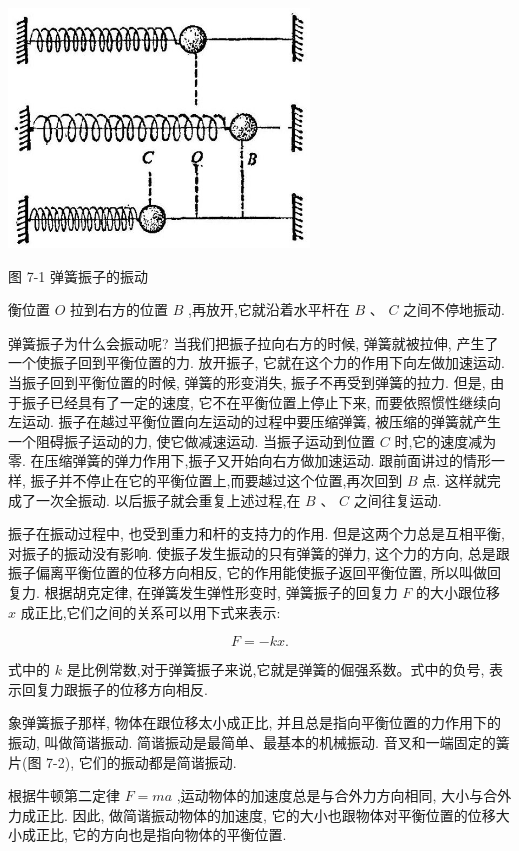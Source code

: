 \documentclass[10pt]{article}
\begin{document}
\begin{center}
\includegraphics[max width=0.6\textwidth]{images/01912d55-147c-70aa-b0e0-1782a122f948_192_826669.jpg}
\end{center}

图 7-1 弹簧振子的振动

衡位置 \(O\) 拉到右方的位置 \(B\) ,再放开,它就沿着水平杆在 \(B\) 、 \(C\) 之间不停地振动.

弹簧振子为什么会振动呢? 当我们把振子拉向右方的时候, 弹簧就被拉伸, 产生了一个使振子回到平衡位置的力. 放开振子, 它就在这个力的作用下向左做加速运动. 当振子回到平衡位置的时候, 弹簧的形变消失, 振子不再受到弹簧的拉力. 但是, 由于振子已经具有了一定的速度, 它不在平衡位置上停止下来, 而要依照惯性继续向左运动. 振子在越过平衡位置向左运动的过程中要压缩弹簧, 被压缩的弹簧就产生一个阻碍振子运动的力, 使它做减速运动. 当振子运动到位置 \(C\) 时,它的速度减为零. 在压缩弹簧的弹力作用下,振子又开始向右方做加速运动. 跟前面讲过的情形一样, 振子并不停止在它的平衡位置上,而要越过这个位置,再次回到 \(B\) 点. 这样就完成了一次全振动. 以后振子就会重复上述过程,在 \(B\) 、 \(C\) 之间往复运动.

振子在振动过程中, 也受到重力和杆的支持力的作用. 但是这两个力总是互相平衡, 对振子的振动没有影响. 使振子发生振动的只有弹簧的弹力, 这个力的方向, 总是跟振子偏离平衡位置的位移方向相反, 它的作用能使振子返回平衡位置, 所以叫做回复力. 根据胡克定律, 在弹簧发生弹性形变时, 弹簧振子的回复力 \(F\) 的大小跟位移 \(x\) 成正比,它们之间的关系可以用下式来表示:

\[
F = - {kx}.
\]

式中的 \(k\) 是比例常数,对于弹簧振子来说,它就是弹簧的倔强系数。式中的负号, 表示回复力跟振子的位移方向相反.

象弹簧振子那样, 物体在跟位移太小成正比, 并且总是指向平衡位置的力作用下的振动, 叫做简谐振动. 简谐振动是最简单、最基本的机械振动. 音叉和一端固定的簧片(图 7-2), 它们的振动都是简谐振动.

根据牛顿第二定律 \(F = {ma}\) ,运动物体的加速度总是与合外力方向相同, 大小与合外力成正比. 因此, 做简谐振动物体的加速度, 它的大小也跟物体对平衡位置的位移大小成正比, 它的方向也是指向物体的平衡位置.
\end{document}
